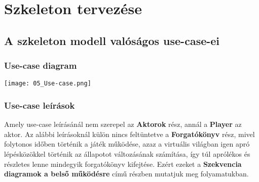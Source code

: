 


\setcounter{section}{4}




\fedlap

\section{Szkeleton tervezése}

\subsection{A szkeleton modell valóságos use-case-ei}

\subsubsection{Use-case diagram}

\begin{center}
\texttt{[image: 05\_Use-case.png]}
\newpage
\end{center}

\subsubsection{Use-case leírások}
Amely use-case leírásánál nem szerepel az \textbf{Aktorok} rész, annál a \textbf{Player} az aktor. Az alábbi leírásoknál külön nincs feltüntetve a \textbf{Forgatókönyv} rész, mivel folytonos időben történik a játék működése, azaz a virtuális világban igen apró lépésközökkel történik az állapotot változásának számítása, így túl aprólékos és részletes lenne mindegyik forgatókönyv kifejtése. Ezért ezeket a \textbf{Szekvencia diagramok a belső működésre} című részben mutatjuk meg folyamatukban.

\begin{usecase}
\end{usecase}

